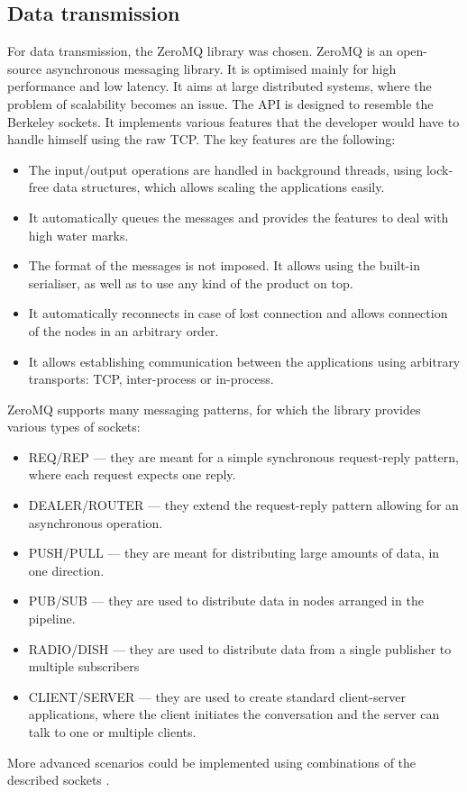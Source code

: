     \subsection{Data transmission} \label{subsec:ZeroMQ}
        For data transmission, the ZeroMQ library was chosen. ZeroMQ is an open-source asynchronous messaging library. It is optimised mainly for high performance and low latency. It aims at large distributed systems, where the problem of scalability becomes an issue. The API is designed to resemble the Berkeley sockets. It implements various features that the developer would have to handle himself using the raw TCP. The key features are the following:
        \begin{itemize}
            \item The input/output operations are handled in background threads, using lock-free data structures, which allows scaling the applications easily. 
            \item It automatically queues the messages and provides the features to deal with high water marks. 
            \item The format of the messages is not imposed. It allows using the built-in serialiser, as well as to use any kind of the product on top.
            \item It automatically reconnects in case of lost connection and allows connection of the nodes in an arbitrary order.
            \item It allows establishing communication between the applications using arbitrary transports: TCP, inter-process or in-process.
        \end{itemize}
        ZeroMQ supports many messaging patterns, for which the library provides various types of sockets:
        \begin{itemize}
            \item REQ/REP --- they are meant for a simple synchronous request-reply pattern, where each request expects one reply.
            \item DEALER/ROUTER --- they extend the request-reply pattern allowing for an asynchronous operation.
            \item PUSH/PULL --- they are meant for distributing large amounts of data, in one direction.
            \item PUB/SUB --- they are used to distribute data in nodes arranged in the pipeline.
            \item RADIO/DISH --- they are used to distribute data from a single publisher to multiple subscribers
            \item CLIENT/SERVER --- they are used to create standard client-server applications, where the client initiates the conversation and the server can talk to one or multiple clients.
        \end{itemize}
        More advanced scenarios could be implemented using combinations of the described sockets \cite{zeromq_guide}.
        
